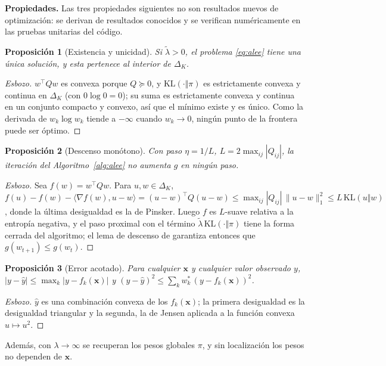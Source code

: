 \documentclass[11pt]{article}
\newtheorem{proposicion}{Proposición}
\begin{document}
\textbf{Propiedades.} Las tres propiedades siguientes no son resultados nuevos de optimización: se derivan de resultados conocidos y se verifican numéricamente en las pruebas unitarias del código.

\begin{proposicion}[Existencia y unicidad]
Si $\tilde\lambda>0$, el problema \eqref{eq:alee} tiene una única solución, y esta pertenece al interior de $\Delta_K$.
\end{proposicion}
\begin{proof}[Esbozo]
$w^\top Q w$ es convexa porque $Q\succeq0$, y $\mathrm{KL}(\cdot\Vert\pi)$ es estrictamente convexa y continua en $\Delta_K$ (con $0\log0=0$); su suma es estrictamente convexa y continua en un conjunto compacto y convexo, así que el mínimo existe y es único. Como la derivada de $w_k\log w_k$ tiende a $-\infty$ cuando $w_k\to0$, ningún punto de la frontera puede ser óptimo.
\end{proof}

\begin{proposicion}[Descenso monótono]
Con paso $\eta = 1/L$, $L=2\max_{ij}|Q_{ij}|$, la iteración del Algoritmo~\ref{alg:alee} no aumenta $g$ en ningún paso.
\end{proposicion}
\begin{proof}[Esbozo]
Sea $f(w)=w^\top Qw$. Para $u,w\in\Delta_K$, $f(u)-f(w)-\langle\nabla f(w),u-w\rangle=(u-w)^\top Q(u-w)\le\max_{ij}|Q_{ij}|\,\lVert u-w\rVert_1^2\le L\,\mathrm{KL}(u\Vert w)$, donde la última desigualdad es la de Pinsker. Luego $f$ es $L$-suave relativa a la entropía negativa, y el paso proximal con el término $\tilde\lambda\,\mathrm{KL}(\cdot\Vert\pi)$ tiene la forma cerrada del algoritmo; el lema de descenso de \cite{bauschke2017} garantiza entonces que $g(w_{t+1})\le g(w_t)$.
\end{proof}

\begin{proposicion}[Error acotado]
Para cualquier $\mathbf{x}$ y cualquier valor observado $y$, $|y-\hat y|\le\max_k|y-f_k(\mathbf{x})|$ y $(y-\hat y)^2\le\sum_k w^*_k\,(y-f_k(\mathbf{x}))^2$.
\end{proposicion}
\begin{proof}[Esbozo]
$\hat y$ es una combinación convexa de los $f_k(\mathbf{x})$; la primera desigualdad es la desigualdad triangular y la segunda, la de Jensen aplicada a la función convexa $u\mapsto u^2$.
\end{proof}

Además, con $\lambda\to\infty$ se recuperan los pesos globales $\pi$, y sin localización los pesos no dependen de $\mathbf{x}$.
\end{document}
